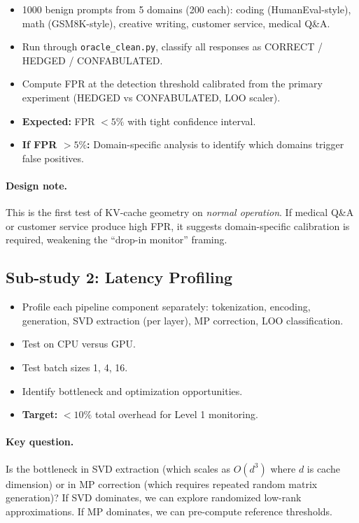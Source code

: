 \documentclass[11pt,letterpaper]{article}
\begin{document}
\begin{itemize}
  \item 1000 benign prompts from 5 domains (200 each): coding
    (HumanEval-style), math (GSM8K-style), creative writing, customer
    service, medical Q\&A.
  \item Run through \texttt{oracle\_clean.py}, classify all responses as
    CORRECT / HEDGED / CONFABULATED.
  \item Compute FPR at the detection threshold calibrated from the
    primary experiment (HEDGED vs CONFABULATED, LOO scaler).
  \item \textbf{Expected:} FPR $< 5\%$ with tight confidence interval.
  \item \textbf{If FPR $> 5\%$:} Domain-specific analysis to identify
    which domains trigger false positives.
\end{itemize}

\paragraph{Design note.} This is the first test of KV-cache geometry on
\emph{normal operation}. If medical Q\&A or customer service produce
high FPR, it suggests domain-specific calibration is required, weakening
the ``drop-in monitor'' framing.

\subsection{Sub-study 2: Latency Profiling}

\begin{itemize}
  \item Profile each pipeline component separately: tokenization,
    encoding, generation, SVD extraction (per layer), MP correction, LOO
    classification.
  \item Test on CPU versus GPU.
  \item Test batch sizes 1, 4, 16.
  \item Identify bottleneck and optimization opportunities.
  \item \textbf{Target:} $< 10\%$ total overhead for Level 1 monitoring.
\end{itemize}

\paragraph{Key question.} Is the bottleneck in SVD extraction (which
scales as $O(d^3)$ where $d$ is cache dimension) or in MP correction
(which requires repeated random matrix generation)? If SVD dominates, we
can explore randomized low-rank approximations. If MP dominates, we can
pre-compute reference thresholds.
\end{document}
